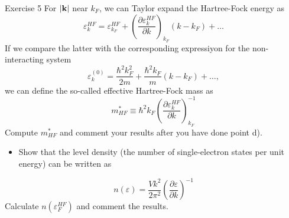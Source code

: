 \documentclass{beamer}
\begin{document}
\begin{frame}
\begin{block}{Exercise 5 }
\noindent
For $\vert{\bf k}\vert$ near $k_{F}$, we can Taylor expand the Hartree-Fock energy as  
\[
\varepsilon_{k}^{HF}=\varepsilon_{k_{F}}^{HF}+
\left(\frac{\partial\varepsilon_{k}^{HF}}{\partial k}\right)_{k_{F}}(k-k_{F})+\dots
\]
If we compare the latter with the corresponding expressiyon for the non-interacting system
\[
\varepsilon_{k}^{(0)}=\frac{\hbar^{2}k^{2}_{F}}{2m}+
\frac{\hbar^{2}k_{F}}{m}\left(k-k_{F}\right)+\dots ,
\]
we can define the so-called effective Hartree-Fock mass as
\[
m_{HF}^{*}\equiv\hbar^{2}k_{F}\left(
\frac{\partial\varepsilon_{k}^{HF}}
{\partial k}\right)_{k_{F}}^{-1}
\]
Compute $m_{HF}^{*}$ and comment your results after you have done 
point d). \newline
\begin{itemize}
 \item Show that the level density (the number of single-electron states per unit energy) can be written as
\end{itemize}

\noindent
\[
n(\varepsilon)=\frac{Vk^{2}}{2\pi^{2}}\left(
\frac{\partial\varepsilon}{\partial k}\right)^{-1}
\]
Calculate $n(\varepsilon_{F}^{HF})$ and comment the results.


\end{block}
\end{frame}
\end{document}
